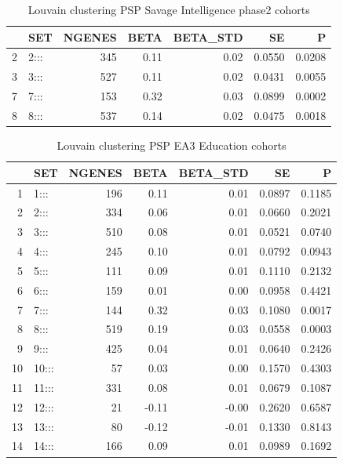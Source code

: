 \begin{table}[ht]
\centering
\begin{tabular}{rlrrrrr}
  \hline
 & SET & NGENES & BETA & BETA\_STD & SE & P \\ 
  \hline
2 & 2::: & 345 & 0.11 & 0.02 & 0.0550 & 0.0208 \\ 
  3 & 3::: & 527 & 0.11 & 0.02 & 0.0431 & 0.0055 \\ 
  7 & 7::: & 153 & 0.32 & 0.03 & 0.0899 & 0.0002 \\ 
  8 & 8::: & 537 & 0.14 & 0.02 & 0.0475 & 0.0018 \\ 
   \hline
\end{tabular}
\caption{Louvain clustering PSP Savage Intelligence phase2 cohorts}
\label{tab:Louvain clustering Savage intelligence phase 2 cohorts}
\end{table}


\begin{table}[ht]
\centering
\begin{tabular}{rlrrrrr}
  \hline
 & SET & NGENES & BETA & BETA\_STD & SE & P \\ 
  \hline
1 & 1::: & 196 & 0.11 & 0.01 & 0.0897 & 0.1185 \\ 
  2 & 2::: & 334 & 0.06 & 0.01 & 0.0660 & 0.2021 \\ 
  3 & 3::: & 510 & 0.08 & 0.01 & 0.0521 & 0.0740 \\ 
  4 & 4::: & 245 & 0.10 & 0.01 & 0.0792 & 0.0943 \\ 
  5 & 5::: & 111 & 0.09 & 0.01 & 0.1110 & 0.2132 \\ 
  6 & 6::: & 159 & 0.01 & 0.00 & 0.0958 & 0.4421 \\ 
  7 & 7::: & 144 & 0.32 & 0.03 & 0.1080 & 0.0017 \\ 
  8 & 8::: & 519 & 0.19 & 0.03 & 0.0558 & 0.0003 \\ 
  9 & 9::: & 425 & 0.04 & 0.01 & 0.0640 & 0.2426 \\ 
  10 & 10::: & 57 & 0.03 & 0.00 & 0.1570 & 0.4303 \\ 
  11 & 11::: & 331 & 0.08 & 0.01 & 0.0679 & 0.1087 \\ 
  12 & 12::: & 21 & -0.11 & -0.00 & 0.2620 & 0.6587 \\ 
  13 & 13::: & 80 & -0.12 & -0.01 & 0.1330 & 0.8143 \\ 
  14 & 14::: & 166 & 0.09 & 0.01 & 0.0989 & 0.1692 \\ 
   \hline
\end{tabular}
\caption{Louvain clustering PSP EA3 Education cohorts}
\label{tab:Louvain clustering EA3 Education cohorts}
\end{table}

